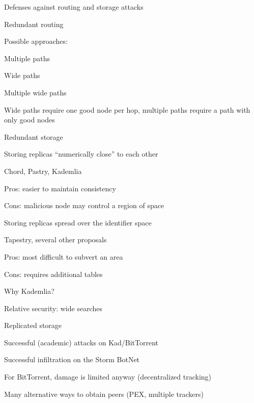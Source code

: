 \begin{frame}{Defenses against routing and storage attacks}

\BIL
\item \alert{Redundant routing}
  \BI
  \item Possible approaches:
	  \BI
	  \item Multiple paths
	  \item Wide paths
	  \item Multiple wide paths
	  \EI
  \item Wide paths require one good node per hop, multiple paths require
    a path with only good nodes
  \EI
\item \alert{Redundant storage} 
  \BI
  \item Storing replicas “numerically close” to each other
    \BI
       \item Chord, Pastry, Kademlia
	   \item Pros: easier to maintain consistency
	   \item Cons: malicious node may control a region of space
    \EI
  \item Storing replicas spread over the identifier space
    \BI
       \item Tapestry, several other proposals
       \item Pros: most difficult to subvert an area
       \item Cons: requires additional tables
    \EI
  \EI
\EIL

\end{frame}

\begin{frame}{Why Kademlia?}

\BI
\item Relative security: wide searches
\item Replicated storage
\EI

\smallskip
{}
\BI
\item Successful (academic) attacks on Kad/BitTorrent
\item Successful infiltration on the Storm BotNet
\EI

\smallskip
{}
\BI
\item For BitTorrent, damage is limited anyway (decentralized tracking)
\item Many alternative ways to obtain peers (PEX, multiple trackers)
\EI


\end{frame}


